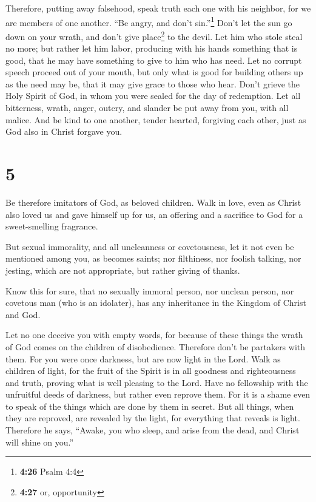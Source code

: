  Therefore, putting away falsehood, speak truth each one
with his neighbor, for we are members of one another. 
``Be angry, and don't sin.''\footnote{\textbf{4:26} Psalm 4:4} Don't let
the sun go down on your wrath,  and don't give
place\footnote{\textbf{4:27} or, opportunity} to the devil.
 Let him who stole steal no more; but rather let him
labor, producing with his hands something that is good, that he may have
something to give to him who has need.  Let no corrupt
speech proceed out of your mouth, but only what is good for building
others up as the need may be, that it may give grace to those who hear.
 Don't grieve the Holy Spirit of God, in whom you were
sealed for the day of redemption.  Let all bitterness,
wrath, anger, outcry, and slander be put away from you, with all malice.
 And be kind to one another, tender hearted, forgiving
each other, just as God also in Christ forgave you.

\hypertarget{section-4}{%
\section{5}\label{section-4}}

 Be therefore imitators of God, as beloved children.
 Walk in love, even as Christ also loved us and gave
himself up for us, an offering and a sacrifice to God for a
sweet-smelling fragrance.

 But sexual immorality, and all uncleanness or
covetousness, let it not even be mentioned among you, as becomes saints;
 nor filthiness, nor foolish talking, nor jesting, which
are not appropriate, but rather giving of thanks.

 Know this for sure, that no sexually immoral person, nor
unclean person, nor covetous man (who is an idolater), has any
inheritance in the Kingdom of Christ and God.

 Let no one deceive you with empty words, for because of
these things the wrath of God comes on the children of disobedience.
 Therefore don't be partakers with them. 
For you were once darkness, but are now light in the Lord. Walk as
children of light,  for the fruit of the Spirit is in all
goodness and righteousness and truth,  proving what is
well pleasing to the Lord.  Have no fellowship with the
unfruitful deeds of darkness, but rather even reprove them.
 For it is a shame even to speak of the things which are
done by them in secret.  But all things, when they are
reproved, are revealed by the light, for everything that reveals is
light.  Therefore he says, ``Awake, you who sleep, and
arise from the dead, and Christ will shine on you.''

